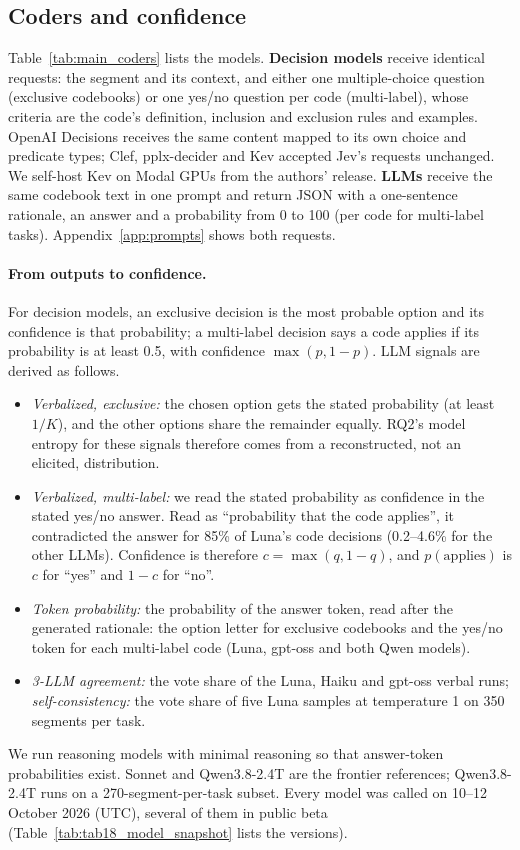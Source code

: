 

\subsection{Coders and confidence}
Table~\ref{tab:main_coders} lists the models. \textbf{Decision models} receive identical requests: the segment and its
context, and either one multiple-choice question (exclusive codebooks) or one yes/no question per code (multi-label), whose
criteria are the code's definition, inclusion and exclusion rules and examples. OpenAI Decisions receives the same content
mapped to its own choice and predicate types; Clef, pplx-decider and Kev accepted Jev's requests unchanged. We self-host Kev
on Modal GPUs from the authors' release. \textbf{LLMs} receive the same codebook text in one prompt and return JSON with a
one-sentence rationale, an answer and a probability from 0 to 100 (per code for multi-label tasks). Appendix~\ref{app:prompts}
shows both requests.

\paragraph{From outputs to confidence.} For decision models, an exclusive decision is the most probable option and its
confidence is that probability; a multi-label decision says a code applies if its probability is at least 0.5, with
confidence $\max(p, 1-p)$. LLM signals are derived as follows.
\begin{itemize}
  \item \emph{Verbalized, exclusive:} the chosen option gets the stated probability (at least $1/K$), and the other options
  share the remainder equally. RQ2's model entropy for these signals therefore comes from a reconstructed, not an elicited,
  distribution.
  \item \emph{Verbalized, multi-label:} we read the stated probability as confidence in the stated yes/no answer. Read as
  ``probability that the code applies'', it contradicted the answer for 85\% of Luna's code decisions (0.2--4.6\% for the
  other LLMs). Confidence is therefore $c=\max(q, 1-q)$, and $p(\text{applies})$ is $c$ for ``yes'' and $1-c$ for ``no''.
  \item \emph{Token probability:} the probability of the answer token, read after the generated rationale: the option letter
  for exclusive codebooks and the yes/no token for each multi-label code (Luna, gpt-oss and both Qwen models).
  \item \emph{3-LLM agreement:} the vote share of the Luna, Haiku and gpt-oss verbal runs; \emph{self-consistency:} the vote
  share of five Luna samples at temperature 1 on 350 segments per task.
\end{itemize}
We run reasoning models with minimal reasoning so that answer-token probabilities exist. Sonnet and Qwen3.8-2.4T are the
frontier references; Qwen3.8-2.4T runs on a 270-segment-per-task subset. Every model was called on 10--12 October 2026 (UTC),
several of them in public beta (Table~\ref{tab:tab18_model_snapshot} lists the versions).

